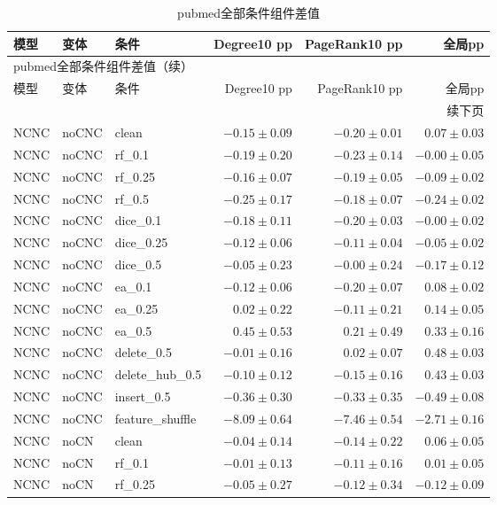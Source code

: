 \documentclass[UTF8,a4paper,11pt,fontset=fandol]{ctexart}
\begin{document}
{\footnotesize
\setlength{\tabcolsep}{3pt}
\begin{longtable}{lllrrr}
\caption{pubmed全部条件组件差值}\\
\toprule
模型 & 变体 & 条件 & Degree10 pp & PageRank10 pp & 全局pp \\
\midrule
\endfirsthead
\multicolumn{6}{l}{pubmed全部条件组件差值（续）}\\
\toprule
模型 & 变体 & 条件 & Degree10 pp & PageRank10 pp & 全局pp \\
\midrule
\endhead
\midrule\multicolumn{6}{r}{续下页}\\
\endfoot
\bottomrule\endlastfoot
NCNC & noCNC & clean & $-0.15\pm0.09$ & $-0.20\pm0.01$ & $0.07\pm0.03$ \\
NCNC & noCNC & rf\_0.1 & $-0.19\pm0.20$ & $-0.23\pm0.14$ & $-0.00\pm0.05$ \\
NCNC & noCNC & rf\_0.25 & $-0.16\pm0.07$ & $-0.19\pm0.05$ & $-0.09\pm0.02$ \\
NCNC & noCNC & rf\_0.5 & $-0.25\pm0.17$ & $-0.18\pm0.07$ & $-0.24\pm0.02$ \\
NCNC & noCNC & dice\_0.1 & $-0.18\pm0.11$ & $-0.20\pm0.03$ & $-0.00\pm0.02$ \\
NCNC & noCNC & dice\_0.25 & $-0.12\pm0.06$ & $-0.11\pm0.04$ & $-0.05\pm0.02$ \\
NCNC & noCNC & dice\_0.5 & $-0.05\pm0.23$ & $-0.00\pm0.24$ & $-0.17\pm0.12$ \\
NCNC & noCNC & ea\_0.1 & $-0.12\pm0.06$ & $-0.20\pm0.07$ & $0.08\pm0.02$ \\
NCNC & noCNC & ea\_0.25 & $0.02\pm0.22$ & $-0.11\pm0.21$ & $0.14\pm0.05$ \\
NCNC & noCNC & ea\_0.5 & $0.45\pm0.53$ & $0.21\pm0.49$ & $0.33\pm0.16$ \\
NCNC & noCNC & delete\_0.5 & $-0.01\pm0.16$ & $0.02\pm0.07$ & $0.48\pm0.03$ \\
NCNC & noCNC & delete\_hub\_0.5 & $-0.10\pm0.12$ & $-0.15\pm0.16$ & $0.43\pm0.03$ \\
NCNC & noCNC & insert\_0.5 & $-0.36\pm0.30$ & $-0.33\pm0.35$ & $-0.49\pm0.08$ \\
NCNC & noCNC & feature\_shuffle & $-8.09\pm0.64$ & $-7.46\pm0.54$ & $-2.71\pm0.16$ \\
NCNC & noCN & clean & $-0.04\pm0.14$ & $-0.14\pm0.22$ & $0.06\pm0.05$ \\
NCNC & noCN & rf\_0.1 & $-0.01\pm0.13$ & $-0.11\pm0.16$ & $0.01\pm0.05$ \\
NCNC & noCN & rf\_0.25 & $-0.05\pm0.27$ & $-0.12\pm0.34$ & $-0.12\pm0.09$ \\

\end{longtable}}
\end{document}
